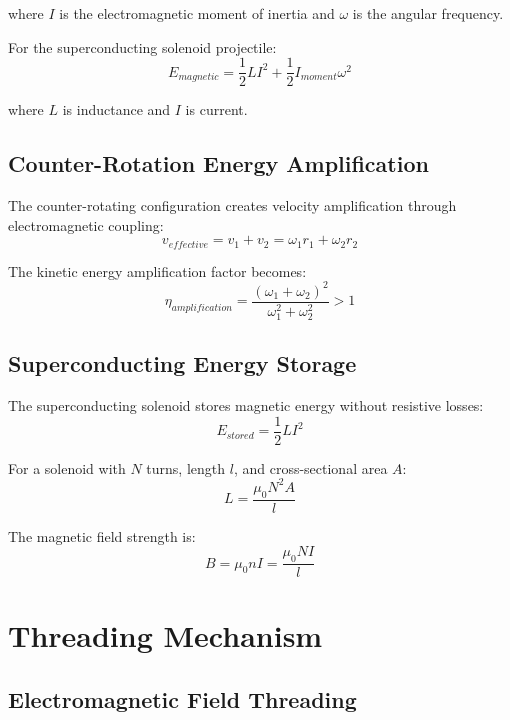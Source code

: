 \documentclass[12pt,a4paper]{article}
\begin{document}
where $I$ is the electromagnetic moment of inertia and $\omega$ is the angular frequency.

For the superconducting solenoid projectile:
\begin{equation}
E_{magnetic} = \frac{1}{2}LI^2 + \frac{1}{2}I_{moment}\omega^2
\end{equation}

where $L$ is inductance and $I$ is current.

\subsection{Counter-Rotation Energy Amplification}

The counter-rotating configuration creates velocity amplification through electromagnetic coupling:
\begin{equation}
v_{effective} = v_1 + v_2 = \omega_1 r_1 + \omega_2 r_2
\end{equation}

The kinetic energy amplification factor becomes:
\begin{equation}
\eta_{amplification} = \frac{(\omega_1 + \omega_2)^2}{\omega_1^2 + \omega_2^2} > 1
\end{equation}

\subsection{Superconducting Energy Storage}

The superconducting solenoid stores magnetic energy without resistive losses:
\begin{equation}
E_{stored} = \frac{1}{2}L I^2
\end{equation}

For a solenoid with $N$ turns, length $l$, and cross-sectional area $A$:
\begin{equation}
L = \frac{\mu_0 N^2 A}{l}
\end{equation}

The magnetic field strength is:
\begin{equation}
B = \mu_0 n I = \frac{\mu_0 N I}{l}
\end{equation}

\section{Threading Mechanism}

\subsection{Electromagnetic Field Threading}
\end{document}
